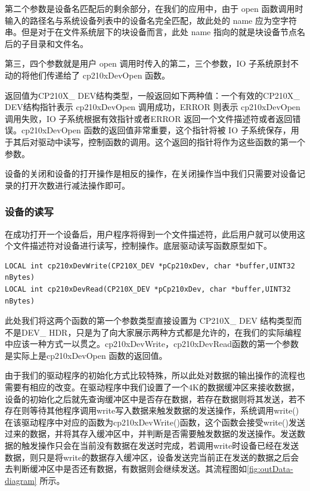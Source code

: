 	第二个参数是设备名匹配后的剩余部分，在我们的应用中，由于 open 函数调用时输入的路径名与系统设备列表中的设备名完全匹配，故此处的 name 应为空字符串。但是对于在文件系统层下的块设备而言，此处 name 指向的就是块设备节点名后的子目录和文件名。

	第三，四个参数就是用户 open 调用时传入的第二，三个参数，IO 子系统原封不动的将他们传递给了 cp210xDevOpen 函数。
	
	返回值为CP210X\_ DEV结构类型，一般返回如下两种值：一个有效的CP210X\_ DEV结构指针表示 cp210xDevOpen 调用成功，ERROR 则表示 cp210xDevOpen 调用失败，IO 子系统根据有效指针或者ERROR 返回一个文件描述符或者返回错误。cp210xDevOpen 函数的返回值非常重要，这个指针将被 IO 子系统保存，用于其后对驱动中读写，控制函数的调用。这个返回的指针将作为这些函数的第一个参数。
	
	设备的关闭和设备的打开操作是相反的操作，在关闭操作当中我们只需要对设备记录的打开次数进行减法操作即可。

\subsubsection{设备的读写}
	在成功打开一个设备后，用户程序将得到一个文件描述符，此后用户就可以使用这个文件描述符对设备进行读写，控制操作。底层驱动读写函数原型如下。

\lstset{language=C}
\begin{lstlisting}
LOCAL int cp210xDevWrite(CP210X_DEV *pCp210xDev, char *buffer,UINT32 nBytes)
LOCAL int cp210xDevRead(CP210X_DEV *pCp210xDev, char *buffer,UINT32 nBytes)
\end{lstlisting}

此处我们将这两个函数的第一个参数类型直接设置为 CP210X\_ DEV 结构类型而不是DEV\_ HDR，只是为了向大家展示两种方式都是允许的，在我们的实际编程中应该一种方式一以贯之。cp210xDevWrite，cp210xDevRead函数的第一个参数是实际上是cp210xDevOpen 函数的返回值。

由于我们的驱动程序的初始化方式比较特殊，所以此处对数据的输出操作的流程也需要有相应的改变。在驱动程序中我们设置了一个4K的数据缓冲区来接收数据，设备的初始化之后就先查询缓冲区中是否存在数据，若存在数据则将其发送，若不存在则等待其他程序调用write写入数据来触发数据的发送操作，系统调用write()在该驱动程序中对应的函数为cp210xDevWrite()函数，这个函数会接受write()发送过来的数据，并将其存入缓冲区中，并判断是否需要触发数据的发送操作。发送数据的触发操作只会在当前没有数据在发送时完成，若调用write时设备已经在发送数据，则只是将write的数据存入缓冲区，设备发送完当前正在发送的数据之后会去判断缓冲区中是否还有数据，有数据则会继续发送。其流程图如\autoref{fig:outData-diagram} 所示。

